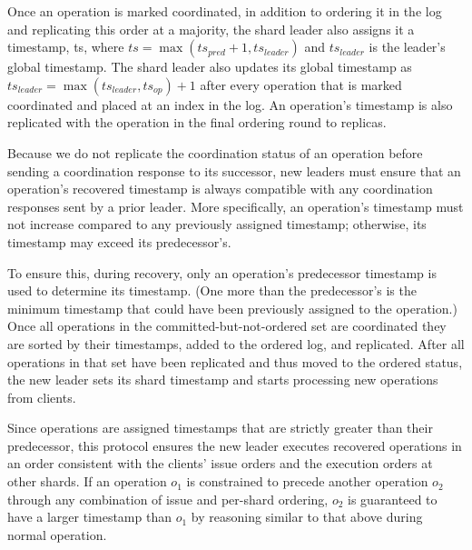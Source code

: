 Once an operation is marked coordinated, in addition to ordering it in the log and replicating this order at a majority, the shard leader also assigns it a timestamp, ts, where $ts = \max(ts_{pred} + 1, ts_{leader})$ and $ts_{leader}$ is the leader's global timestamp. The shard leader also updates its global timestamp as $ts_{leader} = \max(ts_{leader}, ts_{op}) + 1$ after every operation that is marked coordinated and placed at an index in the log. An operation's timestamp is also replicated with the operation in the final ordering round to replicas.

Because we do not replicate the coordination status of an operation before sending a coordination response to its successor, new leaders must ensure that an operation's recovered timestamp is always compatible with any coordination responses sent by a prior leader. More specifically, an operation's timestamp must not increase compared to any previously assigned timestamp; otherwise, its timestamp may exceed its predecessor's.

To ensure this, during recovery, only an operation's predecessor timestamp is used to determine its timestamp.
(One more than the predecessor's is the minimum timestamp that could have been previously assigned to the operation.) 
Once all operations in the committed-but-not-ordered set are coordinated they are sorted by their timestamps, added to the ordered log, and replicated.
After all operations in that set have been replicated and thus moved to the ordered status, the new leader sets its shard timestamp and starts processing new operations from clients.

Since operations are assigned timestamps that are strictly greater than their predecessor, this protocol ensures the new leader executes recovered operations
in an order consistent with the clients' issue orders and the execution orders at other shards. If an operation $o_1$ is constrained to precede another operation $o_2$ through any combination of issue and per-shard ordering, $o_2$
is guaranteed to have a larger timestamp than $o_1$ by reasoning similar to that above during normal operation. 

